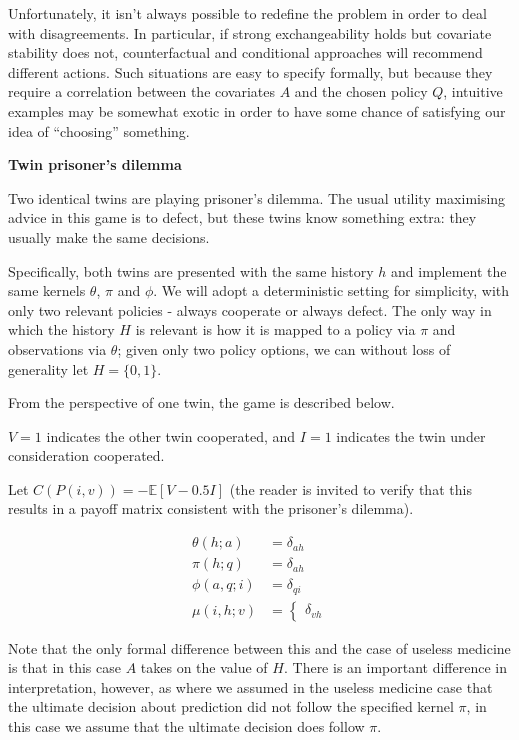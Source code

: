 Unfortunately, it isn't always possible to redefine the problem in order to deal with disagreements. In particular, if strong exchangeability holds but covariate stability does not, counterfactual and conditional approaches will recommend different actions. Such situations are easy to specify formally, but because they require a correlation between the covariates $A$ and the chosen policy $Q$, intuitive examples may be somewhat exotic in order to have some chance of satisfying our idea of ``choosing'' something. 

\textbf{Twin prisoner's dilemma}

Two identical twins are playing prisoner's dilemma. The usual utility maximising advice in this game is to defect, but these twins know something extra: they usually make the same decisions.

Specifically, both twins are presented with the same history $h$ and implement the same kernels $\theta$, $\pi$ and $\phi$. We will adopt a deterministic setting for simplicity, with only two relevant policies - always cooperate or always defect. The only way in which the history $H$ is relevant is how it is mapped to a policy via $\pi$ and observations via $\theta$; given only two policy options, we can without loss of generality let $H=\{0,1\}$. 

From the perspective of one twin, the game is described below.

$V=1$ indicates the other twin cooperated, and $I=1$ indicates the twin under consideration cooperated.

Let $C(P(i,v)) = -\mathbb{E}[V-0.5I]$ (the reader is invited to verify that this results in a payoff matrix consistent with the prisoner's dilemma).

\begin{align}
    \theta(h;a) &= \delta_{ah}\\
    \pi(h;q) &= \delta_{ah}\\
    \phi(a,q;i) &= \delta_{q i}\\
    \mu(i,h;v) &= \begin{cases} \delta_{vh}
    \end{cases}
\end{align}

Note that the only formal difference between this and the case of useless medicine is that in this case $A$ takes on the value of $H$. There is an important difference in interpretation, however, as where we assumed in the useless medicine case that the ultimate decision about prediction did not follow the specified kernel $\pi$, in this case we assume that the ultimate decision does follow $\pi$.

